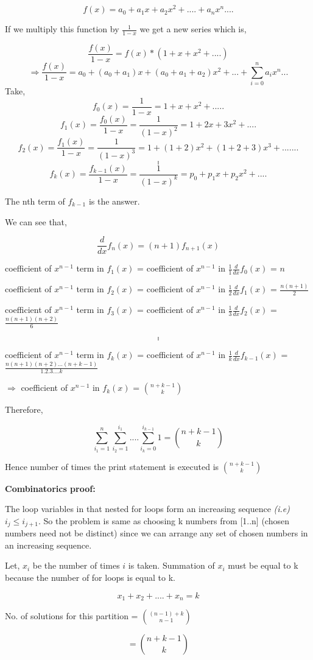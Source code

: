 \documentclass[12pt]{article}
\begin{document}
\begin{enumerate}
    \[ f(x) = a_0 + a_1x + a_2x^2 + .... + a_nx^n.... \]
    
    If we multiply this function by $\frac{1}{1-x}$ we get a new series which is,
    
    \[ \frac{f(x)}{1-x} = f(x)*(1+x+x^2+....) \]
    \[ \Rightarrow \frac{f(x)}{1-x} = a_0 + (a_0+a_1)x + (a_0+a_1+a_2)x^2 + ... + \sum_{i=0}^{n} a_ix^n... \]
     Take, 
    \[f_0(x) = \frac{1}{1-x} = 1+x+x^2+.....\]
    \[ f_1(x) = \frac{f_0(x)}{1-x} = \frac{1}{(1-x)^2} = 1 + 2x + 3x^2 +....\]
    \[ f_2(x) = \frac{f_1(x)}{1-x} = \frac{1}{(1-x)^3} = 1 + (1+2)x^2 + (1+2+3)x^3+ .......\]
    \[ . \]
    \[ . \]
    \[ . \]
    \[ f_k(x) = \frac{f_{k-1}(x)}{1-x} = \frac{1}{(1-x)^k} = p_0 + p_1x + p_2x^2 + .... \]
    
    The nth term of $f_{k-1}$ is the answer.
    
    We can see that,
    
    \[ \frac{d}{dx}f_n(x) = (n+1)f_{n+1}(x) \]
    
    coefficient of $x^{n-1}$ term in $f_1(x)$ = coefficient of $x^{n-1}$ in $\frac{1}{1} \frac{d}{dx}f_0(x)$ = $n$
    
    coefficient of $x^{n-1}$ term in $f_2(x)$ = coefficient of $x^{n-1}$ in $\frac{1}{2} \frac{d}{dx}f_1(x)$ = $\frac{n(n+1)}{2}$
    
    coefficient of $x^{n-1}$ term in $f_3(x)$ = coefficient of $x^{n-1}$ in $\frac{1}{3} \frac{d}{dx}f_2(x)$ = $\frac{n(n+1)(n+2)}{6}$
    
    \[ .\]
    \[ .\]
    \[ .\]
    
    coefficient of $x^{n-1}$ term in $f_k(x)$ = coefficient of $x^{n-1}$ in $\frac{1}{k} \frac{d}{dx}f_{k-1}(x)$ = $\frac{n(n+1)(n+2)...(n+k-1)}{1.2.3....k}$
    
    $\Rightarrow$ coefficient of $x^{n-1}$ in $f_k(x)$ = $\binom{n+k-1}{k}$
    
    Therefore,
    
    \[ \sum_{i_1=1}^{n} \sum_{i_2=1}^{i_1}.... \sum_{i_k=0}^{i_{k-1}} 1 = \binom{n+k-1}{k} \]
    
    Hence number of times the print statement is executed is $\binom{n+k-1}{k}$
    
    \textbf{Combinatorics proof:}
    
    The loop variables in that nested for loops form an increasing sequence \textit{(i.e)} $i_j \leq i_{j+1}$. So the problem is same as choosing k numbers from [1..n] (chosen numbers need not be distinct) since we can arrange any set of chosen numbers in an increasing sequence.
    
    Let, $x_i$ be the number of times $i$ is taken. Summation of $x_i$ must be equal to k because the number of for loops is equal to k.
    
    \[ x_1 + x_2 + .... + x_n = k \]
    
    No. of solutions for this partition = $\binom{(n-1)+k}{n-1}$
    
    \[ = \binom{n+k-1}{k} \]
     
\end{enumerate}
\end{document}
